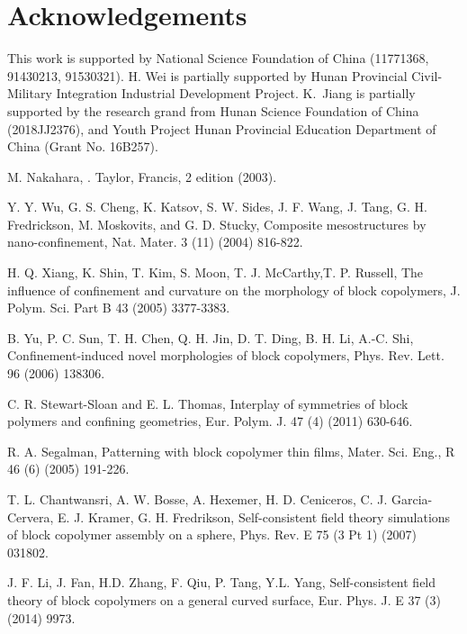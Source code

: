 \documentclass[final,1p,times]{elsarticle}
\begin{document}
\section*{Acknowledgements} This work is supported by National Science
Foundation of China (11771368, 91430213, 91530321). H. Wei is partially
supported by  Hunan Provincial Civil-Military Integration Industrial
Development Project. K.~Jiang is partially supported by the research grand from
Hunan Science Foundation of China (2018JJ2376), and Youth Project Hunan
Provincial Education Department of China (Grant No. 16B257).


\appendix



\begin{thebibliography}{100}

M. Nakahara, 
.
Taylor, Francis, 2 edition (2003).

Y. Y. Wu,  G. S. Cheng, K. Katsov, S. W. Sides, J. F. Wang, J. Tang, G. H. Fredrickson, M. Moskovits, and G. D. Stucky,
Composite mesostructures by nano-confinement,
{Nat. Mater.}
3 (11) (2004) 816-822.

H. Q. Xiang, K. Shin, T. Kim, S. Moon, T. J. McCarthy,T. P. Russell, 
The influence of confinement and curvature on the morphology of block copolymers,
J. Polym. Sci. Part B 43 (2005) 3377-3383.

B. Yu, P. C. Sun, T. H. Chen, Q. H. Jin, D. T. Ding, B. H. Li,
A.-C. Shi, Confinement-induced novel morphologies of block copolymers, Phys. Rev. Lett. 96 (2006) 138306.

{C. R. Stewart-Sloan and E. L. Thomas},
Interplay of symmetries of block polymers and confining geometries,
{Eur. Polym. J}.
47 (4) (2011) 630-646.

R. A. Segalman,
Patterning with block copolymer thin films,
{Mater. Sci. Eng., R}
46 (6) (2005) 191-226.

T. L. Chantwansri, A. W. Bosse, A. Hexemer, H. D. Ceniceros, C. J.
Garcia-Cervera, E. J. Kramer, G. H. Fredrikson,
Self-consistent field theory simulations of block copolymer assembly on a sphere,
{Phys. Rev. E} 75 (3 Pt 1) (2007) 031802.


J. F. Li, J. Fan, H.D. Zhang, F. Qiu, P. Tang, Y.L. Yang,
Self-consistent field theory of block copolymers on a general curved surface,
{Eur. Phys. J. E} 37 (3) (2014) 9973.


\end{thebibliography}
\end{document}

